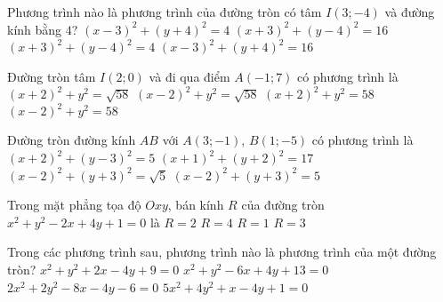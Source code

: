 \begin{ex}%
	Phương trình nào là phương trình của đường tròn có tâm $I(3;-4)$ và đường kính bằng $4$?
	\choice
	{\True $(x-3)^2+(y+4)^2=4$}
	{$(x+3)^2+(y-4)^2=16$}
	{$(x+3)^2+(y-4)^{2}=4$}
	{$(x-3)^2+(y+4)^2=16$}
\end{ex}

\begin{ex}%
	Đường tròn tâm $I(2;0)$ và đi qua điểm $A(-1;7)$ có phương trình là
	\choice
	{$(x+2)^2+y^2=\sqrt{58}$}
	{$(x-2)^2+y^2=\sqrt{58}$}
	{$(x+2)^2+y^2=58$}
	{\True $(x-2)^2+y^2=58$}
\end{ex}

\begin{ex}%
	Đường tròn đường kính $AB$ với $A(3;-1)$, $B(1;-5)$ có phương trình là
	\choice
	{$(x+2)^2+(y-3)^2=5$}
	{$(x+1)^2+(y+2)^2=17$}
	{$(x-2)^2+(y+3)^2=\sqrt{5}$}
	{\True $(x-2)^2+(y+3)^2=5$}
\end{ex}

\begin{ex}%
	Trong mặt phẳng tọa độ $Oxy$, bán kính $R$ của đường tròn $x^2+y^2-2x+4y+1=0$ là
	\choice
	{\True $R=2$}
	{$R=4$}
	{$R=1$}
	{$R=3$}
\end{ex}

\begin{ex}%
	Trong các phương trình sau, phương trình nào là phương trình của một đường tròn?
	\choice
	{$x^2+y^2+2x-4y+9= 0$}
	{$x^2+y^2-6x+4y+13=0$}
	{\True $2x^2+2y^2-8x-4y-6=0$}
	{$5x^2+4y^2+x-4y+1=0$}
\end{ex}

